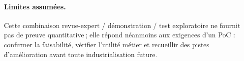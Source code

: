 \paragraph{Limites assumées.}
Cette combinaison revue-expert / démonstration / test exploratoire ne fournit
pas de preuve quantitative ; elle répond néanmoins aux exigences d’un PoC :
confirmer la faisabilité, vérifier l’utilité métier et recueillir des pistes
d’amélioration avant toute industrialisation future.
